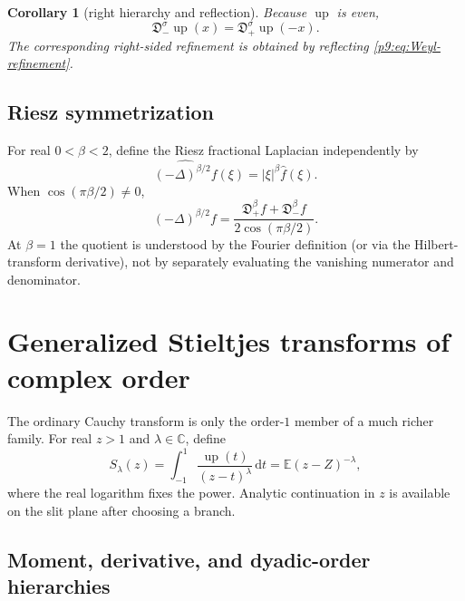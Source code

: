 \documentclass[11pt,oneside]{article}
\newtheorem{corollary}[theorem]{Corollary}
\theoremstyle{definition}
\theoremstyle{remark}
\newcommand{\Up}{\operatorname{up}}
\newcommand{\E}{\mathbb E}
\newcommand{\C}{\mathbb C}
\newcommand{\dd}{\,\mathrm d}
\newcommand{\1}{\mathbf 1}
\begin{document}
\begin{corollary}[right hierarchy and reflection]
Because $\Up$ is even,
\begin{equation}
 \mathfrak D_-^\sigma\Up(x)
 =\mathfrak D_+^\sigma\Up(-x).
 \label{p9:eq:Weyl-reflection}
\end{equation}
The corresponding right-sided refinement is obtained by reflecting
\cref{p9:eq:Weyl-refinement}.
\end{corollary}

\subsection{Riesz symmetrization}

For real $0<\beta<2$, define the Riesz fractional Laplacian independently by
\begin{equation}
 \widehat{(-\Delta)^{\beta/2}f}(\xi)
 =|\xi|^\beta\widehat f(\xi).
 \label{p9:eq:Riesz-Fourier}
\end{equation}
When $\cos(\pi\beta/2)\ne0$,
\begin{equation}
 (-\Delta)^{\beta/2}f
 =\frac{\mathfrak D_+^\beta f+\mathfrak D_-^\beta f}
 {2\cos(\pi\beta/2)}.
 \label{p9:eq:Riesz-Weyl}
\end{equation}
At $\beta=1$ the quotient is understood by the Fourier definition (or via the
Hilbert-transform derivative), not by separately evaluating the vanishing
numerator and denominator.

\section{Generalized Stieltjes transforms of complex order}
\label{p9:sec:Stieltjes}

The ordinary Cauchy transform is only the order-$1$ member of a much richer
family.  For real $z>1$ and $\lambda\in\C$, define
\begin{equation}
 S_\lambda(z)
 =\int_{-1}^1\frac{\Up(t)}{(z-t)^\lambda}\dd t
 =\E(z-Z)^{-\lambda},
 \label{p9:eq:S-lambda}
\end{equation}
where the real logarithm fixes the power.  Analytic continuation in $z$ is
available on the slit plane after choosing a branch.

\subsection{Moment, derivative, and dyadic-order hierarchies}
\end{document}
